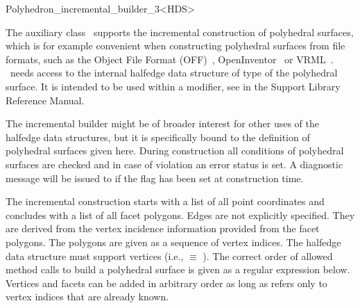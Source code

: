 
\ccRefPageBegin



\begin{ccRefClass}{Polyhedron_incremental_builder_3<HDS>}
\label{pagePolyIncrBuilder}

\ccDefinition
{}
  
The auxiliary class \ccClassTemplateName\ supports the incremental
construction of polyhedral surfaces, which is for example convenient
when constructing polyhedral surfaces from file formats, such as the
Object File Format (OFF)~\cite{p-gmgv15-94},
OpenInventor~\cite{w-impoo-94} or VRML~\cite{bpp-vrml-95,vrmls-96}.
\ccClassTemplateName\ needs access to the internal halfedge data
structure of type  of the polyhedral surface. It is intended
to be used within a modifier, see  in the 
Support Library Reference Manual.

The incremental builder might be of broader interest for other uses of
the halfedge data structures, but it is specifically bound to the
definition of polyhedral surfaces given here. During construction all
conditions of polyhedral surfaces are checked and in case of violation
an error status is set. A diagnostic message will be issued to
 if the  flag has been set at construction
time.

The incremental construction starts with a list of all point
coordinates and concludes with a list of all facet polygons. Edges are
not explicitly specified. They are derived from the vertex incidence
information provided from the facet polygons. The polygons are given as a
sequence of vertex indices.  The halfedge data structure  must
support vertices (i.e.,  $\equiv$
). The correct order of allowed method calls to build a
polyhedral surface is given as a regular expression below. Vertices and
facets can be added in arbitrary order as long as
 refers only to vertex indices that are
already known.


\end{ccRefClass}

